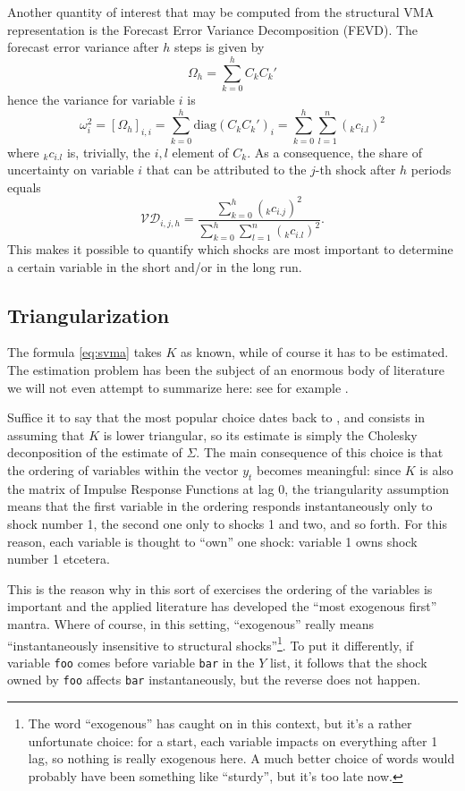 Another quantity of interest that may be computed from the structural
VMA representation is the Forecast Error Variance Decomposition
(FEVD). The forecast error variance after $h$ steps is given by
\[
  \Omega_h = \sum_{k=0}^h C_k C_k'
\]
hence the variance for variable $i$ is
\[
  \omega^2_i = \left[ \Omega_h \right]_{i,i} = \sum_{k=0}^h
  \mathrm{diag}(C_k C_k')_i =
  \sum_{k=0}^h \sum_{l=1}^n ({}_kc_{i.l})^2 
\]
where ${}_kc_{i.l}$ is, trivially, the $i,l$ element of $C_k$. As a
consequence, the share of uncertainty on variable $i$ that can be
attributed to the $j$-th shock after $h$ periods equals
\[
  \mathcal{VD}_{i,j,h} =
  \frac{\sum_{k=0}^h ({}_kc_{i.j})^2 }{  \sum_{k=0}^h \sum_{l=1}^n
    ({}_kc_{i.l})^2 } .
\]
This makes it possible to quantify which shocks are most important to
determine a certain variable in the short and/or in the long run.

\subsection{Triangularization}

The formula \ref{eq:svma} takes $K$ as known, while of course it has
to be estimated. The estimation problem has been the subject of an
enormous body of literature we will not even attempt to summarize
here: see for example \cite[chapter 9]{LKBook05}.

Suffice it to say that the most popular choice dates back to
\cite{sims80}, and consists in assuming that $K$ is lower triangular,
so its estimate is simply the Cholesky deconposition of the estimate of
$\Sigma$. The main consequence of this choice is that the ordering of
variables within the vector $y_t$ becomes meaningful: since $K$ is
also the matrix of Impulse Response Functions at lag 0, the
triangularity assumption means that the first variable in the ordering
responds instantaneously only to shock number 1, the second one only
to shocks 1 and two, and so forth. For this reason, each variable is
thought to ``own'' one shock: variable 1 owns shock number 1 etcetera.

This is the reason why in this sort of exercises the ordering of the
variables is important and the applied literature has developed the
``most exogenous first'' mantra. Where of course, in this setting,
``exogenous'' really means ``instantaneously insensitive to structural
shocks''\footnote{The word ``exogenous'' has caught on in this
  context, but it's a rather unfortunate choice: for a start, each
  variable impacts on everything after 1 lag, so nothing is really
  exogenous here. A much better choice of words would probably have
  been something like ``sturdy'', but it's too late now.}. To put it
differently, if variable \texttt{foo} comes before variable
\texttt{bar} in the $Y$ list, it follows that the shock owned by
\texttt{foo} affects \texttt{bar} instantaneously, but the reverse
does not happen.

